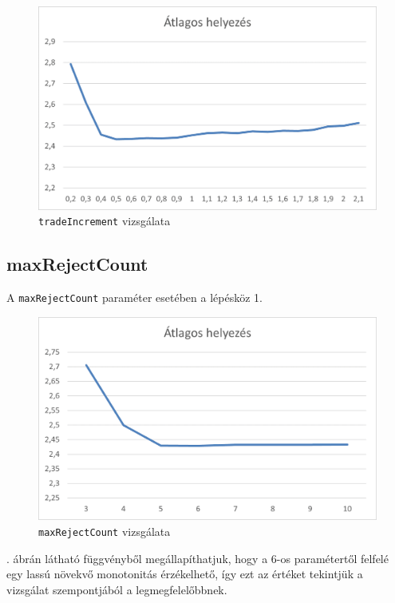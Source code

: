 \begin{figure}[h!]
\centering
\includegraphics[scale=0.2]{images/sdf.png}
\caption{\texttt{tradeIncrement} vizsgálata}
\label{fig:tradeIncrement}
\end{figure}

\subsection{maxRejectCount}

A \texttt{maxRejectCount} paraméter esetében a lépésköz 1.

\begin{figure}[h!]
\centering
\includegraphics[scale=0.2]{images/ff.png}
\caption{\texttt{maxRejectCount} vizsgálata}
\label{fig:maxRejectCount}
\end{figure}

. ábrán látható függvényből megállapíthatjuk, hogy a 6-os paramétertől felfelé egy lassú növekvő monotonitás érzékelhető, így ezt az értéket tekintjük a vizsgálat szempontjából a legmegfelelőbbnek.

